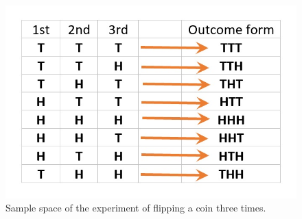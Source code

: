 \documentclass[
]{book}
\begin{document}
\begin{figure}

{\centering \includegraphics[width=0.8\linewidth]{img04/w04-coin-tossing-exp} 

}

\caption{Sample space of the experiment of flipping a coin three times.}\label{fig:unnamed-chunk-58}
\end{figure}
\end{document}
